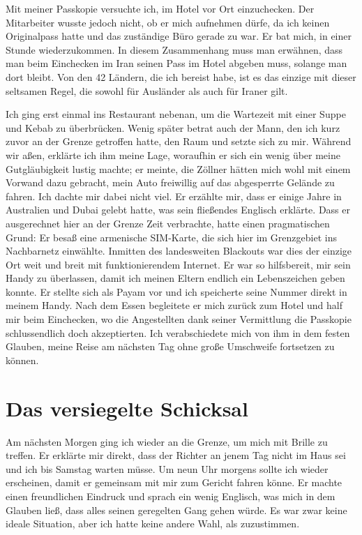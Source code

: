 Mit meiner Passkopie versuchte ich, im Hotel vor Ort einzuchecken. Der Mitarbeiter wusste jedoch nicht, ob er mich aufnehmen dürfe, da ich keinen Originalpass hatte und das zuständige Büro gerade zu war. Er bat mich, in einer Stunde wiederzukommen. In diesem Zusammenhang muss man erwähnen, dass man beim Einchecken im Iran seinen Pass im Hotel abgeben muss, solange man dort bleibt. Von den 42 Ländern, die ich bereist habe, ist es das einzige mit dieser seltsamen Regel, die sowohl für Ausländer als auch für Iraner gilt.

Ich ging erst einmal ins Restaurant nebenan, um die Wartezeit mit einer Suppe und Kebab zu überbrücken. Wenig später betrat auch der Mann, den ich kurz zuvor an der Grenze getroffen hatte, den Raum und setzte sich zu mir. Während wir aßen, erklärte ich ihm meine Lage, woraufhin er sich ein wenig über meine Gutgläubigkeit lustig machte; er meinte, die Zöllner hätten mich wohl mit einem Vorwand dazu gebracht, mein Auto freiwillig auf das abgesperrte Gelände zu fahren. Ich dachte mir dabei nicht viel. Er erzählte mir, dass er einige Jahre in Australien und Dubai gelebt hatte, was sein fließendes Englisch erklärte. Dass er ausgerechnet hier an der Grenze Zeit verbrachte, hatte einen pragmatischen Grund: Er besaß eine armenische SIM-Karte, die sich hier im Grenzgebiet ins Nachbarnetz einwählte. Inmitten des landesweiten Blackouts war dies der einzige Ort weit und breit mit funktionierendem Internet. Er war so hilfsbereit, mir sein Handy zu überlassen, damit ich meinen Eltern endlich ein Lebenszeichen geben konnte. Er stellte sich als Payam vor und ich speicherte seine Nummer direkt in meinem Handy. Nach dem Essen begleitete er mich zurück zum Hotel und half mir beim Einchecken, wo die Angestellten dank seiner Vermittlung die Passkopie schlussendlich doch akzeptierten. Ich verabschiedete mich von ihm in dem festen Glauben, meine Reise am nächsten Tag ohne große Umschweife fortsetzen zu können.

\chapter*{Das versiegelte Schicksal}

Am nächsten Morgen ging ich wieder an die Grenze, um mich mit Brille zu treffen. Er erklärte mir direkt, dass der Richter an jenem Tag nicht im Haus sei und ich bis Samstag warten müsse. Um neun Uhr morgens sollte ich wieder erscheinen, damit er gemeinsam mit mir zum Gericht fahren könne. Er machte einen freundlichen Eindruck und sprach ein wenig Englisch, was mich in dem Glauben ließ, dass alles seinen geregelten Gang gehen würde. Es war zwar keine ideale Situation, aber ich hatte keine andere Wahl, als zuzustimmen.

